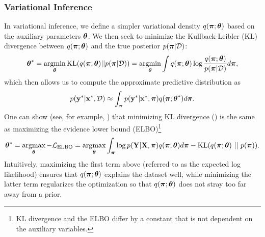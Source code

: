 \subsubsection{Variational Inference}
In variational inference, we define a simpler variational density $q(\boldsymbol{\mathbf{\pi}}; \boldsymbol{\mathbf{\theta}})$ based on the auxiliary parameters $\boldsymbol{\mathbf{\theta}}$. We then seek to minimize the Kullback-Leibler (KL) divergence \citep{kullback1951information} between $q(\boldsymbol{\mathbf{\pi}}; \boldsymbol{\mathbf{\theta}})$ and the true posterior $p(\boldsymbol{\mathbf{\pi}} | \mathcal{D})$:
\begin{equation}
\label{eq:sun_bcnn_KL}
	\boldsymbol{\mathbf{\theta}}^* = \operatorname*{argmin}_{\boldsymbol{\mathbf{\theta}}}\text{KL}(q(\boldsymbol{\mathbf{\pi}}; \boldsymbol{\mathbf{\theta}}) || p(\boldsymbol{\mathbf{\pi}} | \mathcal{D})) = \operatorname*{argmin}_{\boldsymbol{\mathbf{\theta}}} \int q(\boldsymbol{\mathbf{\pi}}; \boldsymbol{\mathbf{\theta}}) \log \frac{q(\boldsymbol{\mathbf{\pi}}; \boldsymbol{\mathbf{\theta}})}{p(\boldsymbol{\mathbf{\pi}} | \mathcal{D})} d \boldsymbol{\mathbf{\pi}},
\end{equation}
which then allows us to compute the approximate predictive distribution as
\begin{equation}
	p(\boldsymbol{\mathbf{y}}^* | \boldsymbol{\mathbf{x}}^*, \mathcal{D}) \approx \int_{\boldsymbol{\mathbf{\pi}}}  p(\boldsymbol{\mathbf{y}}^* | \boldsymbol{\mathbf{x}}^*, \boldsymbol{\mathbf{\pi}}) q(\boldsymbol{\mathbf{\pi}}; \boldsymbol{\mathbf{\theta}}^*) d\boldsymbol{\mathbf{\pi}}.
\end{equation}
One can show (see, for example, \cite{Gal2016UncertaintyThesis}) that minimizing KL divergence () is the same as maximizing the evidence lower bound (ELBO)\footnote{KL divergence and the ELBO differ by a constant that is not dependent on the auxiliary variables.} 
\begin{equation}
\label{eq:sun_bcnn_ELBO}
	\boldsymbol{\mathbf{\theta}}^* = \operatorname*{argmax}_{\boldsymbol{\mathbf{\theta}}} -\mathcal{L}_{\text{ELBO}} = \operatorname*{argmax}_{\boldsymbol{\mathbf{\theta}}} \int_{\boldsymbol{\mathbf{\pi}}}  \log p(\boldsymbol{\mathbf{Y}} | \boldsymbol{\mathbf{X}}, \boldsymbol{\mathbf{\pi}})  q(\boldsymbol{\mathbf{\pi}}; \boldsymbol{\mathbf{\theta}}) d\boldsymbol{\mathbf{\pi}} -  \text{KL}(q(\boldsymbol{\mathbf{\pi}}; \boldsymbol{\mathbf{\theta}}) ~ || ~ p(\boldsymbol{\mathbf{\pi}})).
\end{equation}
Intuitively, maximizing the first term above (referred to as the expected log likelihood) ensures that $q(\boldsymbol{\mathbf{\pi}}; \boldsymbol{\mathbf{\theta}})$ explains the dataset well, while minimizing the latter term regularizes the optimization so that $q(\boldsymbol{\mathbf{\pi}}; \boldsymbol{\mathbf{\theta}})$ does not stray too far away from a prior.





